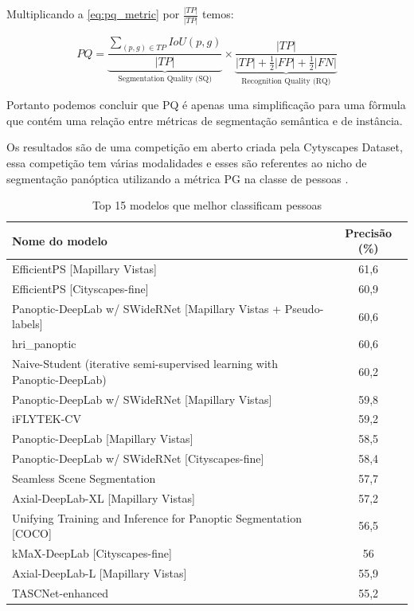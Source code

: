 Multiplicando a \cref{eq:pq_metric} por $\frac{|TP|}{|TP|}$ temos:

\begin{equation*}
	PQ = \underbrace{\frac{\sum_{(p,g)\in TP}IoU(p,g)}{|TP|}}_{\text{Segmentation Quality (SQ)}} 
	\times
	\underbrace{\frac{|TP|}{|TP| + \frac{1}{2}|FP| + \frac{1}{2}|FN|}}_{\text{Recognition Quality (RQ)}}
\end{equation*}

Portanto podemos concluir que PQ é apenas uma simplificação para uma fôrmula que contém uma relação entre métricas de segmentação semântica e de instância.


Os resultados são de uma competição em aberto criada pela Cytyscapes Dataset, essa competição tem várias modalidades e esses são referentes ao nicho de segmentação panóptica utilizando a métrica PG na classe de pessoas \cite{datasetResults}.
\begin{table}[H]
	\centering
	\caption{Top 15 modelos que melhor classificam pessoas}
	\label{tab:resultados-cityscapes}
	\begin{tabular}{|l|c|}
	  \hline
	  Nome do modelo & Precisão (\%) \\
	  \hline
	  EfficientPS [Mapillary Vistas] & 61,6 \\
	  EfficientPS [Cityscapes-fine] & 60,9 \\
	  Panoptic-DeepLab w/ SWideRNet [Mapillary Vistas + Pseudo-labels] & 60,6 \\
	  hri\_panoptic & 60,6 \\
	  Naive-Student (iterative semi-supervised learning with Panoptic-DeepLab) & 60,2 \\
	  Panoptic-DeepLab w/ SWideRNet [Mapillary Vistas] & 59,8 \\
	  iFLYTEK-CV & 59,2 \\
	  Panoptic-DeepLab [Mapillary Vistas] & 58,5 \\
	  Panoptic-DeepLab w/ SWideRNet [Cityscapes-fine] & 58,4 \\
	  Seamless Scene Segmentation & 57,7 \\
	  Axial-DeepLab-XL [Mapillary Vistas] & 57,2 \\
	  Unifying Training and Inference for Panoptic Segmentation [COCO] & 56,5 \\
	  kMaX-DeepLab [Cityscapes-fine] & 56 \\
	  Axial-DeepLab-L [Mapillary Vistas] & 55,9 \\
	  TASCNet-enhanced & 55,2 \\
	  \hline
	\end{tabular}
  \end{table}
  
  


